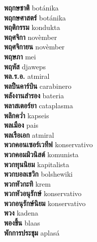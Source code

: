 \textbf{ พฤกษชาติ  } botánika \\
\textbf{ พฤกษศาสตร์  } botánika \\
\textbf{ พฤติกรรม  } kondukta \\
\textbf{ พฤศจิกา  } novèmber \\
\textbf{ พฤศจิกายน  } novèmber \\
\textbf{ พฤษภา  } mei \\
\textbf{ พฤหัส  } djaweps \\
\textbf{ พล.ร.อ.  } atmiral \\
\textbf{ พลปืนคาร์บิน  } carabinero \\
\textbf{ พลังงานสำรอง  } bateria \\
\textbf{ พลาสเตอร์ยา  } cataplasma \\
\textbf{ พลิกคว่ำ  } kapseis \\
\textbf{ พลเมือง  } pais \\
\textbf{ พลเรือเอก  } atmiral \\
\textbf{ พวกคอนเซอร์เวทีฟ  } konservativo \\
\textbf{ พวกคอมมิวนิสต์  } komunista \\
\textbf{ พวกทุนนิยม  } kapitalista \\
\textbf{ พวกบอลเชวิก  } bolshewiki \\
\textbf{ พวกหัวกะทิ  } krem \\
\textbf{ พวกหัวอนุรักษ์  } konservativo \\
\textbf{ พวกอนุรักษ์นิยม  } konservativo \\
\textbf{ พวง  } kadena \\
\textbf{ พองขึ้น  } blaas \\
\textbf{ พักการประชุม  } aplasá \\

